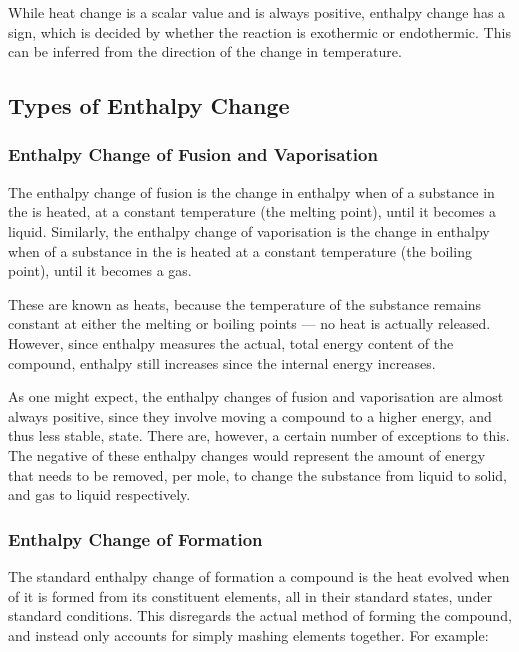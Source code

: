 			While heat change is a scalar value and is always positive, enthalpy change has a sign, which is decided by whether the reaction is
			exothermic or endothermic. This can be inferred from the direction of the change in temperature.


		\subsection{Types of Enthalpy Change}

			\subsubsection{Enthalpy Change of Fusion and Vaporisation}

				The enthalpy change of fusion is the change in enthalpy when  of a substance in the  is heated,
				at a constant temperature (the melting point), until it becomes a liquid. Similarly, the enthalpy change of vaporisation is the
				change in enthalpy when  of a substance in the  is heated at a constant temperature
				(the boiling point), until it becomes a gas.

				These are known as  heats, because the temperature of the substance remains constant at either the melting or
				boiling points — no heat is actually released. However, since enthalpy measures the actual, total energy content of the compound,
				enthalpy still increases since the internal energy increases.

				As one might expect, the enthalpy changes of fusion and vaporisation are almost always positive, since they involve moving a
				compound to a higher energy, and thus less stable, state. There are, however, a certain number of exceptions to this.
				The negative of these enthalpy changes would represent the amount of energy that needs to be removed, per mole, to change the
				substance from liquid to solid, and gas to liquid respectively.



			\subsubsection{Enthalpy Change of Formation}

				The standard enthalpy change of formation a compound is the heat evolved when  of it is formed from its constituent
				elements, all in their standard states, under standard conditions. This disregards the actual method of forming the compound, and
				instead only accounts for simply mashing elements together. For example:

